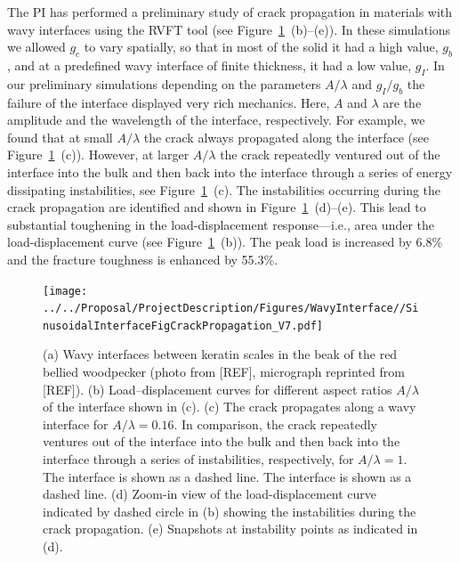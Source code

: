 \documentclass[10pt,letterpaper]{article}
\begin{document}
The PI has performed a preliminary study of crack propagation in materials with wavy interfaces using the RVFT tool (see Figure~\ref{fig:VRF-WI}~(b)--(e)). 
%
In these simulations we allowed $g_c$ to vary spatially, so that in most of the solid it had a high value, $g_{b}$, and at a predefined wavy interface of finite thickness, it had a low value, $g_{I}$. 
%
In our preliminary simulations depending on the parameters $A/\lambda$ and $g_{I}/g_{b}$ the failure of the interface displayed very rich mechanics. 
%
Here, $A$ and $\lambda$ are the amplitude and the wavelength of the interface, respectively. 
%
For example, we found that at small $A/\lambda$ the crack always propagated  along the interface (see Figure~\ref{fig:VRF-WI}~(c)). 
%
However, at larger $A/\lambda$ the crack repeatedly ventured out of the interface into the bulk and then back into the interface through a series of energy dissipating instabilities, see Figure~\ref{fig:VRF-WI}~(c). 
%
The instabilities occurring during the crack propagation are identified and shown in Figure~\ref{fig:VRF-WI}~(d)--(e). 
%
This lead to substantial toughening in the load-displacement response---i.e., area under the load-displacement curve (see Figure~\ref{fig:VRF-WI}~(b)).
%
The peak load is increased by 6.8\% and the fracture toughness is enhanced by 55.3\%. 
%
%
\begin{figure}[h]
	\texttt{[image: ../../Proposal/ProjectDescription/Figures/WavyInterface//SinusoidalInterfaceFigCrackPropagation\_V7.pdf]}
	\centering	
	\caption{ (a) Wavy interfaces between keratin scales in the beak of the red bellied woodpecker (photo from [REF], micrograph reprinted from [REF]). (b) Load--displacement curves for different aspect ratios $A/\lambda$ of the interface shown in (c). (c) The crack propagates along a wavy interface for $A/\lambda = 0.16$. In comparison, the crack repeatedly ventures out of the interface into the bulk and then back into the interface through a series of instabilities, respectively, for $A/\lambda = 1$. The interface is shown as a dashed line. The interface is shown as a dashed line. (d) Zoom-in view of the load-displacement curve indicated by dashed circle in (b) showing the instabilities during the crack propagation. (e) Snapshots at instability points as indicated in (d).
	}
	\label{fig:VRF-WI} 
\end{figure}
\end{document}
